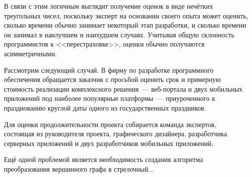 В связи с этим логичным выглядит получение оценок в виде нечётких треугольных чисел, поскольку эксперт на основании своего опыта может оценить, сколько времени обычно занимает некоторый этап разработки, и сколько времени он занимал в наилучшем и наихудшем случаях. Учитывая общую склонность программистов к <<перестраховке>>, оценки обычно получаются асимметричными.

Рассмотрим следующий случай. В фирму по разработке программного обеспечения обращается заказчик с просьбой оценить срок и примерную стоимость реализации комплексного решения~--- веб-портала и двух мобильных приложений под наиболее популярные платформы~--- приуроченного к празднованию круглой даты одного из государственных праздников.

Для оценки продолжительности проекта собирается команда экспертов, состоящая из руководителя проекта, графического дизайнера, разработчика серверных приложений и двух разработчиков мобильных приложений.

Ещё одной проблемой является необходимость создания алгоритма преобразования вершинного графа в стрелочный...